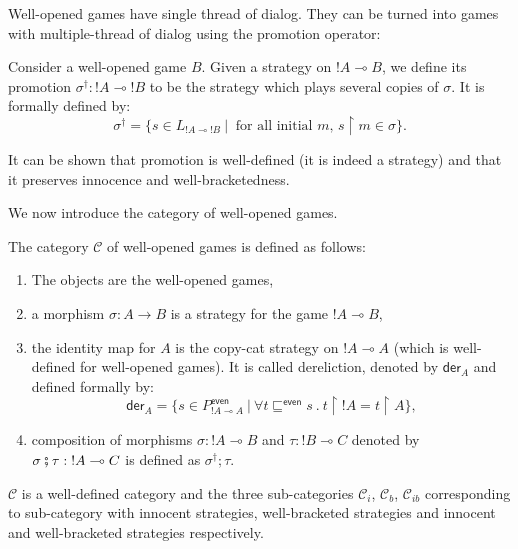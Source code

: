Well-opened games have single thread of dialog. They can be turned
into games with multiple-thread of dialog using the promotion
operator:

\begin{dfn}[Promotion]
Consider a well-opened game $B$. Given a strategy on ${!A} \multimap
B$, we define its promotion $\sigma^\dagger : {!A} \multimap {!B}$
to be the strategy which plays several copies of $\sigma$. It is
formally defined by:
$$ \sigma^\dagger = \{ s \in L_{{!A} \multimap !B} \ | \ \mbox{ for all initial $m$, } s \upharpoonright m \in \sigma  \}.$$
\end{dfn}

It can be shown that promotion is well-defined (it is indeed a strategy) and that it preserves innocence and
well-bracketedness.


We now introduce the category of well-opened games.
\begin{dfn}
The category $\mathcal{C}$ of well-opened games is defined as
follows:
\begin{enumerate}
\item The objects are the well-opened games,
\item a morphism $\sigma : A \rightarrow B$ is a strategy for the game $!A \multimap B$,
\item the identity map for $A$ is the copy-cat strategy on $!A \multimap A$ (which is well-defined for well-opened games).
It is called dereliction, denoted by
$\textsf{der}_A$ and defined formally by:
$$ \textsf{der}_A = \{ s \in P^{\textsf{even}}_{{!A} \multimap A} \ | \ \forall t \sqsubseteq^{\textsf{even}} s \ . \ t \upharpoonright {!A} = t \upharpoonright A \},$$
\item composition of morphisms $\sigma : {!A} \multimap B$ and $\tau : {!B} \multimap C$
denoted by $\sigma \fatsemi \tau : {!A} \multimap C$ is defined as $\sigma^\dagger;\tau$.
\end{enumerate}
\end{dfn}
$\mathcal{C}$ is a well-defined category and the three sub-categories
$\mathcal{C}_i$, $\mathcal{C}_b$, $\mathcal{C}_{ib}$ corresponding to sub-category
with innocent strategies, well-bracketed strategies and innocent and well-bracketed strategies respectively.


